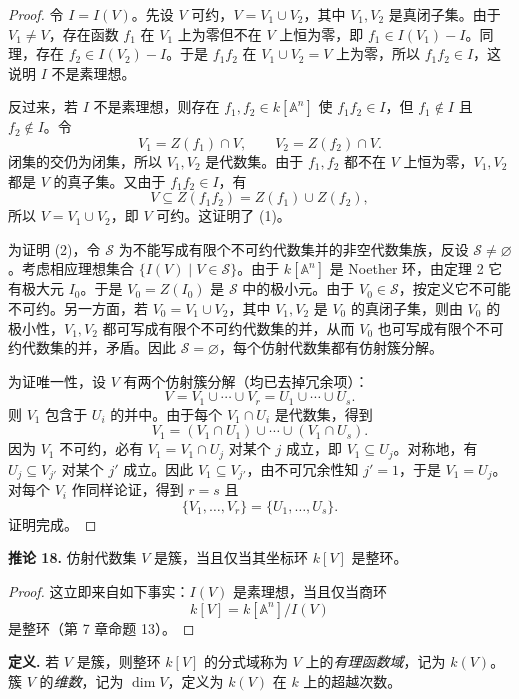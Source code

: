 \begin{proof}
	令 $I=I(V)$。先设 $V$ 可约，$V=V_1\cup V_2$，其中 $V_1,V_2$ 是真闭子集。由于 $V_1\ne V$，存在函数 $f_1$ 在 $V_1$ 上为零但不在 $V$ 上恒为零，即 $f_1\in I(V_1)-I$。同理，存在 $f_2\in I(V_2)-I$。于是 $f_1f_2$ 在 $V_1\cup V_2=V$ 上为零，所以 $f_1f_2\in I$，这说明 $I$ 不是素理想。
	
	反过来，若 $I$ 不是素理想，则存在 $f_1,f_2\in k[\mathbb A^n]$ 使 $f_1f_2\in I$，但 $f_1\notin I$ 且 $f_2\notin I$。令
	\[
	V_1=Z(f_1)\cap V,
	\qquad
	V_2=Z(f_2)\cap V.
	\]
	闭集的交仍为闭集，所以 $V_1,V_2$ 是代数集。由于 $f_1,f_2$ 都不在 $V$ 上恒为零，$V_1,V_2$ 都是 $V$ 的真子集。又由于 $f_1f_2\in I$，有
	\[
	V\subseteq Z(f_1f_2)=Z(f_1)\cup Z(f_2),
	\]
	所以 $V=V_1\cup V_2$，即 $V$ 可约。这证明了 (1)。
	
	为证明 (2)，令 $\mathcal S$ 为不能写成有限个不可约代数集并的非空代数集族，反设 $\mathcal S\ne\varnothing$。考虑相应理想集合 $\{I(V)\mid V\in\mathcal S\}$。由于 $k[\mathbb A^n]$ 是 Noether 环，由定理 2 它有极大元 $I_0$。于是 $V_0=Z(I_0)$ 是 $\mathcal S$ 中的极小元。由于 $V_0\in\mathcal S$，按定义它不可能不可约。另一方面，若 $V_0=V_1\cup V_2$，其中 $V_1,V_2$ 是 $V_0$ 的真闭子集，则由 $V_0$ 的极小性，$V_1,V_2$ 都可写成有限个不可约代数集的并，从而 $V_0$ 也可写成有限个不可约代数集的并，矛盾。因此 $\mathcal S=\varnothing$，每个仿射代数集都有仿射簇分解。
	
	为证唯一性，设 $V$ 有两个仿射簇分解（均已去掉冗余项）：
	\[
	V=V_1\cup\cdots\cup V_r=U_1\cup\cdots\cup U_s.
	\]
	则 $V_1$ 包含于 $U_i$ 的并中。由于每个 $V_1\cap U_i$ 是代数集，得到
	\[
	V_1=(V_1\cap U_1)\cup\cdots\cup(V_1\cap U_s).
	\]
	因为 $V_1$ 不可约，必有 $V_1=V_1\cap U_j$ 对某个 $j$ 成立，即 $V_1\subseteq U_j$。对称地，有 $U_j\subseteq V_{j'}$ 对某个 $j'$ 成立。因此 $V_1\subseteq V_{j'}$，由不可冗余性知 $j'=1$，于是 $V_1=U_j$。对每个 $V_i$ 作同样论证，得到 $r=s$ 且
	\[
	\{V_1,
	\ldots,V_r\}=\{U_1,
	\ldots,U_s\}.
	\]
	证明完成。
\end{proof}

\noindent\textbf{推论 18.} 仿射代数集 $V$ 是簇，当且仅当其坐标环 $k[V]$ 是整环。

\begin{proof}
	这立即来自如下事实：$I(V)$ 是素理想，当且仅当商环
	\[
	k[V]=k[\mathbb A^n]/I(V)
	\]
	是整环（第 7 章命题 13）。
\end{proof}

\noindent\textbf{定义.} 若 $V$ 是簇，则整环 $k[V]$ 的分式域称为 $V$ 上的\emph{有理函数域}，记为 $k(V)$。簇 $V$ 的\emph{维数}，记为 $\dim V$，定义为 $k(V)$ 在 $k$ 上的超越次数。


